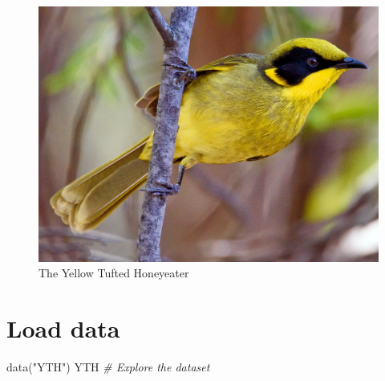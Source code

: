 \documentclass[
  letterpaper,
  DIV=11,
  numbers=noendperiod]{scrreprt}
\newenvironment{Shaded}{\begin{snugshade}}{\end{snugshade}}
\newcommand{\CommentTok}[1]{\textcolor[rgb]{0.38,0.63,0.69}{\textit{#1}}}
\newcommand{\FunctionTok}[1]{\textcolor[rgb]{0.02,0.16,0.49}{#1}}
\newcommand{\NormalTok}[1]{\textcolor[rgb]{0.00,0.44,0.13}{#1}}
\newcommand{\StringTok}[1]{\textcolor[rgb]{0.25,0.44,0.63}{#1}}
\begin{document}
\begin{figure}

{\centering \includegraphics{images/Yellow_Tufted_Honeyeater.jpg}

}

\caption{The Yellow Tufted Honeyeater}

\end{figure}

\hypertarget{load-data}{%
\section*{Load data}\label{load-data}}


\begin{Shaded}
\begin{Highlighting}[]
\FunctionTok{data}\NormalTok{(}\StringTok{"YTH"}\NormalTok{)}
\NormalTok{YTH  }\CommentTok{\# Explore the dataset}
\end{Highlighting}
\end{Shaded}
\end{document}
